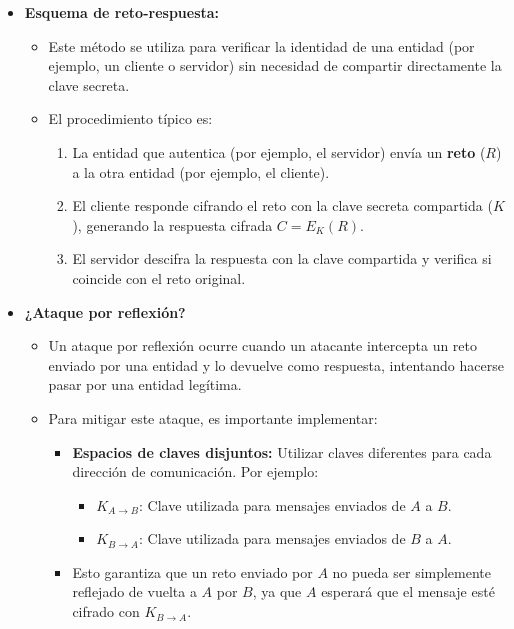 \documentclass[a4paper,12pt]{article}
\begin{document}
\begin{itemize}
    \item \textbf{Esquema de reto-respuesta:}
    \begin{itemize}
        \item Este método se utiliza para verificar la identidad de una entidad (por ejemplo, un cliente o servidor) sin necesidad de compartir directamente la clave secreta.
        \item El procedimiento típico es:
        \begin{enumerate}
            \item La entidad que autentica (por ejemplo, el servidor) envía un \textbf{reto} (\(R\)) a la otra entidad (por ejemplo, el cliente).
            \item El cliente responde cifrando el reto con la clave secreta compartida (\(K\)), generando la respuesta cifrada \(C = E_K(R)\).
            \item El servidor descifra la respuesta con la clave compartida y verifica si coincide con el reto original.
        \end{enumerate}
    \end{itemize}
    \item \textbf{¿Ataque por reflexión?}
    \begin{itemize}
        \item Un ataque por reflexión ocurre cuando un atacante intercepta un reto enviado por una entidad y lo devuelve como respuesta, intentando hacerse pasar por una entidad legítima.
        \item Para mitigar este ataque, es importante implementar:
        \begin{itemize}
            \item \textbf{Espacios de claves disjuntos:} Utilizar claves diferentes para cada dirección de comunicación. Por ejemplo:
            \begin{itemize}
                \item \(K_{A \to B}\): Clave utilizada para mensajes enviados de \(A\) a \(B\).
                \item \(K_{B \to A}\): Clave utilizada para mensajes enviados de \(B\) a \(A\).
            \end{itemize}
            \item Esto garantiza que un reto enviado por \(A\) no pueda ser simplemente reflejado de vuelta a \(A\) por \(B\), ya que \(A\) esperará que el mensaje esté cifrado con \(K_{B \to A}\).
        \end{itemize}
    \end{itemize}
\end{itemize}
\end{document}
